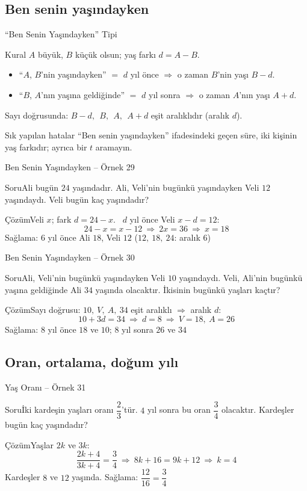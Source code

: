 \documentclass[aspectratio=169,11pt,handout]{beamer}
\newcommand{\soru}[3]{%
\begin{frame}{#1}
  \begin{block}{Soru}\large #2\end{block}
  \pause
  \begin{exampleblock}{Çözüm}\large #3\end{exampleblock}
\end{frame}}
\begin{document}
\subsection{Ben senin yaşındayken}
\begin{frame}{``Ben Senin Yaşındayken'' Tipi}
\begin{block}{Kural}
\(A\) büyük, \(B\) küçük olsun; yaş farkı \(d=A-B\).
\begin{itemize}
\item ``\(A\), \(B\)'nin yaşındayken'' \(=\) \(d\) yıl önce \(\Rightarrow\) o zaman \(B\)'nin yaşı \(B-d\).
\item ``\(B\), \(A\)'nın yaşına geldiğinde'' \(=\) \(d\) yıl sonra \(\Rightarrow\) o zaman \(A\)'nın yaşı \(A+d\).
\end{itemize}
Sayı doğrusunda: \(B-d,\ \ B,\ \ A,\ \ A+d\) eşit aralıklıdır (aralık \(d\)).
\end{block}
\begin{alertblock}{Sık yapılan hatalar}
``Ben senin yaşındayken'' ifadesindeki geçen süre, iki kişinin yaş farkıdır; ayrıca bir \(t\) aramayın.
\end{alertblock}
\end{frame}

\soru{Ben Senin Yaşındayken -- Örnek 29}
{Ali bugün \(24\) yaşındadır. Ali, Veli'nin bugünkü yaşındayken Veli \(12\) yaşındaydı. Veli bugün kaç yaşındadır?}
{Veli \(x\); fark \(d=24-x\). \ \(d\) yıl önce Veli \(x-d=12\):
\[24-x=x-12\ \Rightarrow\ 2x=36\ \Rightarrow\ x=18\]
Sağlama: \(6\) yıl önce Ali \(18\), Veli \(12\) \checkmark \quad (\(12,\ 18,\ 24\): aralık \(6\))}

\soru{Ben Senin Yaşındayken -- Örnek 30}
{Ali, Veli'nin bugünkü yaşındayken Veli \(10\) yaşındaydı. Veli, Ali'nin bugünkü yaşına geldiğinde Ali \(34\) yaşında olacaktır. İkisinin bugünkü yaşları kaçtır?}
{Sayı doğrusu: \(10,\ V,\ A,\ 34\) eşit aralıklı \(\Rightarrow\) aralık \(d\):
\[10+3d=34\ \Rightarrow\ d=8\ \Rightarrow\ V=18,\ A=26\]
Sağlama: \(8\) yıl önce \(18\) ve \(10\); \(8\) yıl sonra \(26\) ve \(34\) \checkmark}

\subsection{Oran, ortalama, doğum yılı}
\soru{Yaş Oranı -- Örnek 31}
{İki kardeşin yaşları oranı \(\dfrac{2}{3}\)'tür. \(4\) yıl sonra bu oran \(\dfrac{3}{4}\) olacaktır. Kardeşler bugün kaç yaşındadır?}
{Yaşlar \(2k\) ve \(3k\):
\[\frac{2k+4}{3k+4}=\frac{3}{4}\ \Rightarrow\ 8k+16=9k+12\ \Rightarrow\ k=4\]
Kardeşler \(8\) ve \(12\) yaşında. \quad Sağlama: \(\dfrac{12}{16}=\dfrac{3}{4}\) \checkmark}
\end{document}
